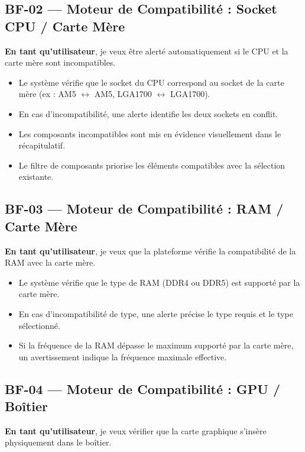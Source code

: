 \documentclass[12pt,a4paper]{article}
\begin{document}
\subsection{BF-02 — Moteur de Compatibilité : Socket CPU / Carte Mère}

\textbf{En tant qu'utilisateur}, je veux être alerté automatiquement si le CPU et la carte mère sont incompatibles.

\begin{itemize}[label=\textbullet]
  \item Le système vérifie que le socket du CPU correspond au socket de la carte mère (ex : AM5 $\leftrightarrow$ AM5, LGA1700 $\leftrightarrow$ LGA1700).
  \item En cas d'incompatibilité, une alerte identifie les deux sockets en conflit.
  \item Les composants incompatibles sont mis en évidence visuellement dans le récapitulatif.
  \item Le filtre de composants priorise les éléments compatibles avec la sélection existante.
\end{itemize}

\subsection{BF-03 — Moteur de Compatibilité : RAM / Carte Mère}

\textbf{En tant qu'utilisateur}, je veux que la plateforme vérifie la compatibilité de la RAM avec la carte mère.

\begin{itemize}[label=\textbullet]
  \item Le système vérifie que le type de RAM (DDR4 ou DDR5) est supporté par la carte mère.
  \item En cas d'incompatibilité de type, une alerte précise le type requis et le type sélectionné.
  \item Si la fréquence de la RAM dépasse le maximum supporté par la carte mère, un avertissement indique la fréquence maximale effective.
\end{itemize}

\subsection{BF-04 — Moteur de Compatibilité : GPU / Boîtier}

\textbf{En tant qu'utilisateur}, je veux vérifier que la carte graphique s'insère physiquement dans le boîtier.
\end{document}
